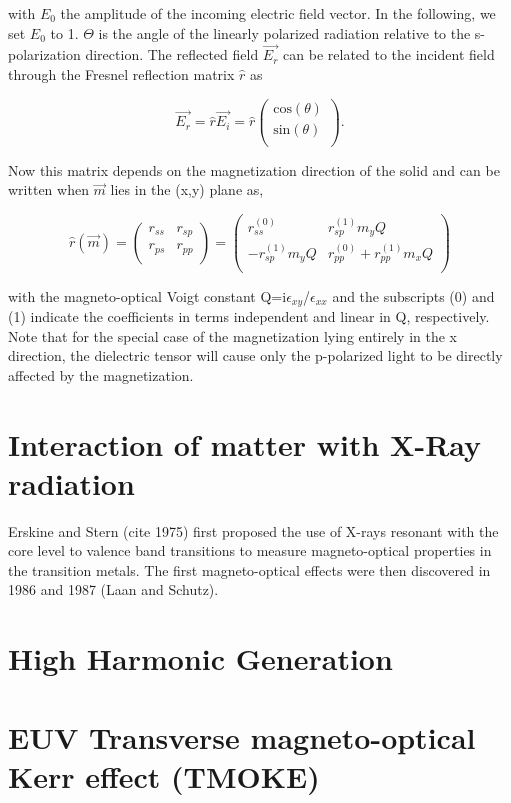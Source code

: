 with $E_0$ the amplitude of the incoming electric field vector. In the following, we set $E_0$ to 1. $\Theta$ is the angle of the linearly polarized radiation relative to the s-polarization direction. The reflected field $\overrightarrow{E_r}$ can be related to the incident field through the Fresnel reflection matrix $\hat{r}$ as

\begin{equation}
\overrightarrow{E_r} = \hat{r}\overrightarrow{E_i}=\hat{r}\left({\begin{array}{c}
	\text{cos}(\theta) \\
	\text{sin}(\theta) \\
	\end{array} } \right) .
\end{equation}

Now this matrix depends on the magnetization direction of the solid and can be written when $\vec{m}$ lies in the (x,y) plane as,

\begin{equation}
\hat{r}(\vec{m})= \left({\begin{array}{cc}
	r_{ss} & r_{sp} \\
	r_{ps} & r_{pp} \\ 
	\end{array} } \right) 
= \left({\begin{array}{cc}
	r_{ss}^{(0)} & r_{sp}^{(1)}m_y Q \\
	-r_{sp}^{(1)} m_y Q & r_{pp}^{(0)}+r_{pp}^{(1)}m_x Q \\ 
	\end{array} } \right)
\end{equation}

with the magneto-optical Voigt constant Q=i$\epsilon_{xy}$/$\epsilon_{xx}$ and the subscripts (0) and (1) indicate the coefficients in terms independent and linear in Q, respectively. Note that for the special case of the magnetization lying entirely in the x direction, the dielectric tensor will cause only the p-polarized light to be directly affected by the magnetization.

\section{Interaction of matter with X-Ray radiation}

Erskine and Stern (cite 1975) first proposed the use of X-rays resonant with the core level to valence band transitions to measure magneto-optical properties in the transition metals. The first magneto-optical effects were then discovered in 1986 and 1987 (Laan and Schutz).

\section{High Harmonic Generation}

\section{EUV Transverse magneto-optical Kerr effect (TMOKE)}